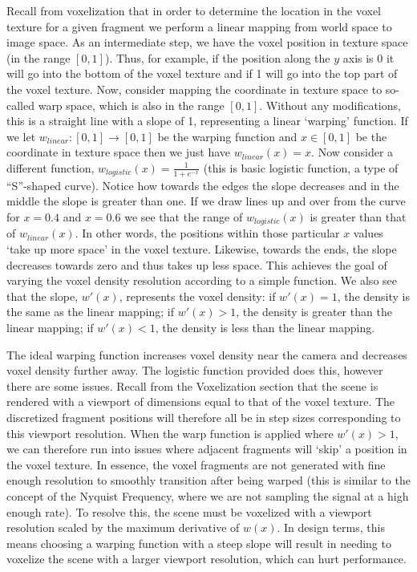 Recall from voxelization that in order to determine the location in the voxel texture for a given fragment we perform a linear mapping from world space to image space. As an intermediate step, we have the voxel position in texture space (in the range $[0, 1]$). Thus, for example, if the position along the $y$ axis is 0 it will go into the bottom of the voxel texture and if 1 will go into the top part of the voxel texture. Now, consider mapping the coordinate in texture space to so-called warp space, which is also in the range $[0, 1]$. Without any modifications, this is a straight line with a slope of 1, representing a linear `warping' function. If we let $w_{linear}: [0, 1] \rightarrow [0, 1]$ be the warping function and $x \in [0, 1]$ be the coordinate in texture space then we just have $w_{linear}(x) = x$. Now consider a different function, $w_{logistic}(x) = \frac{1}{1 + e^{-x}}$ (this is basic logistic function, a type of ``S''-shaped curve). Notice how towards the edges the slope decreases and in the middle the slope is greater than one. If we draw lines up and over from the curve for $x = 0.4$ and $x = 0.6$ we see that the range of $w_{logistic}(x)$ is greater than that of $w_{linear}(x)$. In other words, the positions within those particular $x$ values `take up more space' in the voxel texture. Likewise, towards the ends, the slope decreases towards zero and thus takes up less space. This achieves the goal of varying the voxel density resolution according to a simple function. We also see that the slope, $w'(x)$, represents the voxel density: if $w'(x) = 1$, the density is the same as the linear mapping; if $w'(x) > 1$, the density is greater than the linear mapping; if $w'(x) < 1$, the density is less than the linear mapping.

The ideal warping function increases voxel density near the camera and decreases voxel density further away. The logistic function provided does this, however there are some issues. Recall from the Voxelization section that the scene is rendered with a viewport of dimensions equal to that of the voxel texture. The discretized fragment positions will therefore all be in step sizes corresponding to this viewport resolution. When the warp function is applied where $w'(x) > 1$, we can therefore run into issues where adjacent fragments will `skip' a position in the voxel texture. In essence, the voxel fragments are not generated with fine enough resolution to smoothly transition after being warped (this is similar to the concept of the Nyquist Frequency, where we are not sampling the signal at a high enough rate). To resolve this, the scene must be voxelized with a viewport resolution scaled by the maximum derivative of $w(x)$. In design terms, this means choosing a warping function with a steep slope will result in needing to voxelize the scene with a larger viewport resolution, which can hurt performance. %

